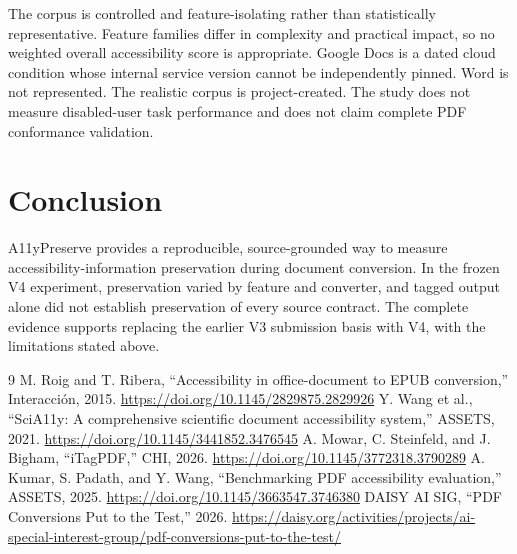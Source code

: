 \documentclass[10pt]{article}
\begin{document}
The corpus is controlled and feature-isolating rather than statistically representative. Feature families differ in complexity and practical impact, so no weighted overall accessibility score is appropriate. Google Docs is a dated cloud condition whose internal service version cannot be independently pinned. Word is not represented. The realistic corpus is project-created. The study does not measure disabled-user task performance and does not claim complete PDF conformance validation.

\section{Conclusion}
A11yPreserve provides a reproducible, source-grounded way to measure accessibility-information preservation during document conversion. In the frozen V4 experiment, preservation varied by feature and converter, and tagged output alone did not establish preservation of every source contract. The complete evidence supports replacing the earlier V3 submission basis with V4, with the limitations stated above.

\begin{thebibliography}{9}
 M. Roig and T. Ribera, ``Accessibility in office-document to EPUB conversion,'' Interacci\'on, 2015. \url{https://doi.org/10.1145/2829875.2829926}
 Y. Wang et al., ``SciA11y: A comprehensive scientific document accessibility system,'' ASSETS, 2021. \url{https://doi.org/10.1145/3441852.3476545}
 A. Mowar, C. Steinfeld, and J. Bigham, ``iTagPDF,'' CHI, 2026. \url{https://doi.org/10.1145/3772318.3790289}
 A. Kumar, S. Padath, and Y. Wang, ``Benchmarking PDF accessibility evaluation,'' ASSETS, 2025. \url{https://doi.org/10.1145/3663547.3746380}
 DAISY AI SIG, ``PDF Conversions Put to the Test,'' 2026. \url{https://daisy.org/activities/projects/ai-special-interest-group/pdf-conversions-put-to-the-test/}
\end{thebibliography}
\end{document}
